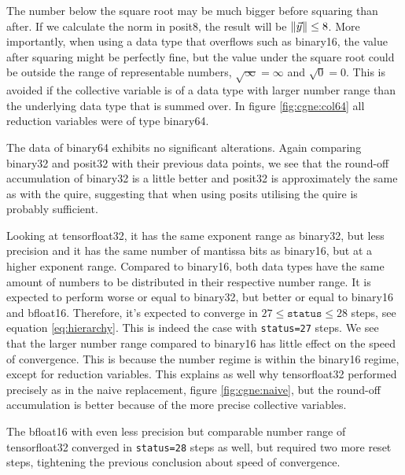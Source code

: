 \documentclass{article}
\theoremstyle{plain} %
\theoremstyle{convention} %
\theoremstyle{remark} %
\def\code#1{\texttt{#1}}
\numberwithin{equation}{section}
\begin{document}
The number below the square root may be much bigger before squaring than after. If we calculate the norm in \gls{posit8}, the result will be $\norm{\vec{y}} \leq 8$. More importantly, when using a data type that overflows such as \gls{binary16}, the value after squaring might be perfectly fine, but the value under the square root could be outside the range of representable numbers, $\sqrt{\infty} = \infty$ and $\sqrt{0} = 0$. This is avoided if the collective variable is of a data type with larger number range than the underlying data type that is summed over. In figure \ref{fig:cgne:col64} all reduction variables were of type \gls{binary64}.

The data of \gls{binary64} exhibits no significant alterations. Again comparing \gls{binary32} and \gls{posit32} with their previous data points, we see that the round-off accumulation of \gls{binary32} is a little better and \gls{posit32} is approximately the same as with the \gls{quire}, suggesting that when using posits utilising the \gls{quire} is probably sufficient.

Looking at \gls{tensorfloat32}, it has the same exponent range as \gls{binary32}, but less precision and it has the same number of mantissa bits as \gls{binary16}, but at a higher exponent range. Compared to \gls{binary16}, both data types have the same amount of numbers to be distributed in their respective number range. It is expected to perform worse or equal to \gls{binary32}, but better or equal to \gls{binary16} and \gls{bfloat16}. Therefore, it's expected to converge in $27 \le \code{status} \le 28$ steps, see equation \eqref{eq:hierarchy}. This is indeed the case with \code{status=27} steps. We see that the larger number range compared to \gls{binary16} has little effect on the speed of convergence. This is because the number regime is within the \gls{binary16} regime, except for reduction variables. This explains as well why \gls{tensorfloat32} performed precisely as in the naive replacement, figure \ref{fig:cgne:naive}, but the round-off accumulation is better because of the more precise collective variables.

The \gls{bfloat16} with even less precision but comparable number range of \gls{tensorfloat32} converged in \code{status=28} steps as well, but required two more reset steps, tightening the previous conclusion about speed of convergence.
\end{document}
